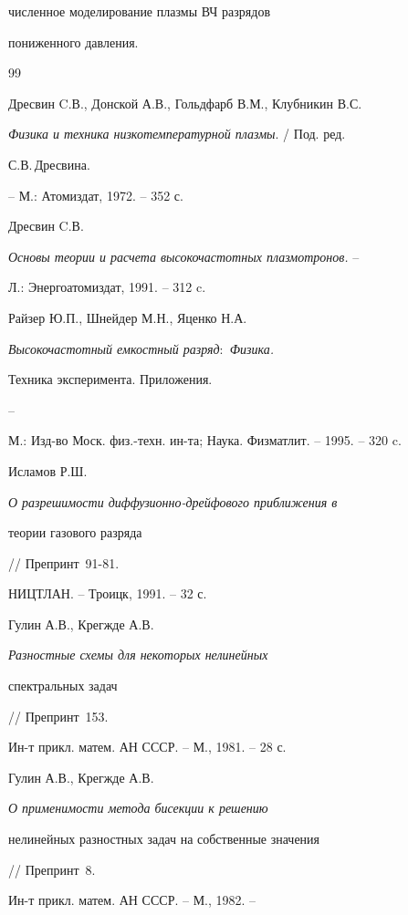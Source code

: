 численное моделирование плазмы ВЧ разрядов


пониженного давления.








\begin{thebibliography}{99} 







Дресвин C.В., Донской А.В., Гольдфарб В.М., Клубникин В.С. 


{\em Физика и техника низкотемпературной плазмы}. / Под. ред.


С.В.\,Дресвина.


-- М.: Атомиздат, 1972. -- 352 с.




Дресвин C.В. 


{\em Основы теории и расчета высокочастотных плазмотронов.} --


Л.: Энергоатомиздат, 1991. -- 312 c.




Райзер Ю.П., Шнейдер М.Н., Яценко Н.А. 


{\em Высокочастотный емкостный разряд$:$ Физика. 


Техника эксперимента. Приложения.} -- 


М.: Изд-во Моск. физ.-техн. ин-та; Наука. Физ\-мат\-лит. -- 1995. -- 320 c.




Исламов Р.Ш. {\em О разрешимости диффузионно-дрейфового приближения в


теории газового разряда} // Препринт \No\,91-81.


НИЦТЛАН. -- Троицк, 1991. -- 32 с.




Гулин А.В., Крегжде А.В. {\em Разностные схемы для некоторых нелинейных


спектральных задач} // Препринт \No\,153.


Ин-т прикл. матем. АН СССР. -- М., 1981. -- 28 с.




Гулин А.В., Крегжде А.В. {\em О применимости метода бисекции к решению 


нелинейных разностных задач на собственные значения} // Препринт \No\,8.


Ин-т прикл. матем. АН СССР. -- М., 1982. --



\end{thebibliography}
